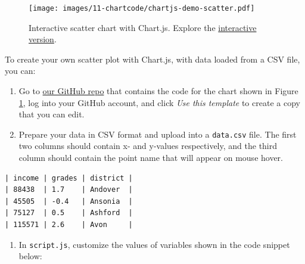 \documentclass[
  english,
]{book}
\providecommand{\tightlist}{%
  \setlength{\itemsep}{0pt}\setlength{\parskip}{0pt}}
\begin{document}
\begin{figure}
\centering
\texttt{[image: images/11-chartcode/chartjs-demo-scatter.pdf]}
\caption{\label{fig:chartjs-demo-scatter}Interactive scatter chart with Chart.js. Explore the \href{https://handsondataviz.github.io/chartjs-scatter/}{interactive version}.}
\end{figure}

To create your own scatter plot with Chart.js, with data loaded from a CSV file, you can:

\begin{enumerate}
\def\labelenumi{\arabic{enumi}.}
\item
  Go to \href{https://github.com/HandsOnDataViz/chartjs-scatter}{our GitHub repo} that contains the code for the chart shown in Figure \ref{fig:chartjs-demo-scatter}, log into your GitHub account, and click \emph{Use this template} to create a copy that you can edit.
\item
  Prepare your data in CSV format and upload into a \texttt{data.csv} file. The first two columns should contain x- and y-values respectively, and the third column should contain the point name that will appear on mouse hover.
\end{enumerate}

\begin{verbatim}
| income | grades | district |
| 88438  | 1.7    | Andover  |
| 45505  | -0.4   | Ansonia  |
| 75127  | 0.5    | Ashford  |
| 115571 | 2.6    | Avon     |
\end{verbatim}

\begin{enumerate}
\def\labelenumi{\arabic{enumi}.}
\setcounter{enumi}{2}
\tightlist
\item
  In \texttt{script.js}, customize the values of variables shown in the code snippet below:
\end{enumerate}
\end{document}
